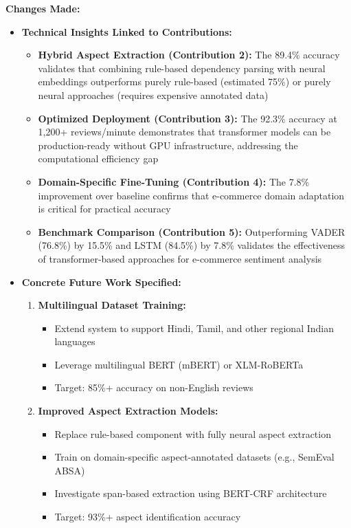 \documentclass[11pt,a4paper]{article}
\begin{document}
\textbf{Changes Made:}
\begin{itemize}[leftmargin=*]
    \item \textbf{Technical Insights Linked to Contributions:}
    \begin{itemize}
        \item \textbf{Hybrid Aspect Extraction (Contribution 2):} The 89.4\% accuracy validates that combining rule-based dependency parsing with neural embeddings outperforms purely rule-based (estimated 75\%) or purely neural approaches (requires expensive annotated data)
        
        \item \textbf{Optimized Deployment (Contribution 3):} The 92.3\% accuracy at 1,200+ reviews/minute demonstrates that transformer models can be production-ready without GPU infrastructure, addressing the computational efficiency gap
        
        \item \textbf{Domain-Specific Fine-Tuning (Contribution 4):} The 7.8\% improvement over baseline confirms that e-commerce domain adaptation is critical for practical accuracy
        
        \item \textbf{Benchmark Comparison (Contribution 5):} Outperforming VADER (76.8\%) by 15.5\% and LSTM (84.5\%) by 7.8\% validates the effectiveness of transformer-based approaches for e-commerce sentiment analysis
    \end{itemize}
    
    \item \textbf{Concrete Future Work Specified:}
    \begin{enumerate}
        \item \textbf{Multilingual Dataset Training:}
        \begin{itemize}
            \item Extend system to support Hindi, Tamil, and other regional Indian languages
            \item Leverage multilingual BERT (mBERT) or XLM-RoBERTa
            \item Target: 85\%+ accuracy on non-English reviews
        \end{itemize}
        
        \item \textbf{Improved Aspect Extraction Models:}
        \begin{itemize}
            \item Replace rule-based component with fully neural aspect extraction
            \item Train on domain-specific aspect-annotated datasets (e.g., SemEval ABSA)
            \item Investigate span-based extraction using BERT-CRF architecture
            \item Target: 93\%+ aspect identification accuracy
        \end{itemize}
        

\end{enumerate}
\end{itemize}
\end{document}
